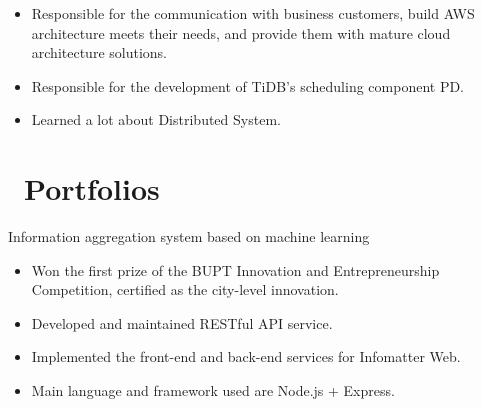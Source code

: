 \documentclass{resume}
\newcommand{\en}[1]{#1}
\newcommand{\zh}[1]{}
\begin{document}
\en{}
\zh{\datedsubsection{\textbf{\href{https://www.amazonaws.cn/}{亚马逊 AWS 中国（AWS China Inc.）}}}{2020/05 -- 2020/06}}
\en{}
\zh{\role{解决方案架构}{解决方案架构师实习}}
\begin{itemize}
      \item \en{Responsible for the communication with business customers, build AWS architecture meets their needs, and provide them with mature cloud architecture solutions.}
            \zh{负责 ToB 客户的技术接洽沟通，搭建符合其需求的 AWS 产品架构，为客户提供成熟的云架构解决方案}
\end{itemize}

\en{}
\zh{\datedsubsection{\textbf{\href{https://pingcap.com/zh/}{北京平凯星辰科技有限公司（PingCAP Inc.）}}}{2020/06 -- 至今}}
\en{}
\zh{\role{数据库研发}{调度研发实习}}
\begin{itemize}
      \item \en{Responsible for the development of TiDB's scheduling component PD.}
            \zh{负责 TiDB 调度组件 PD 的研发工作}
      \item \en{Learned a lot about Distributed System.}
            \zh{学到了很多关于分布式系统的相关知识}
\end{itemize}

\section{\faGithubAlt\ \en{Portfolios}\zh{个人项目}}
\en{Information aggregation system based on machine learning}
\zh{基于机器学习的信息聚合系统}
\begin{itemize}
      \item \en{Won the first prize of the BUPT Innovation and Entrepreneurship Competition, certified as the city-level innovation.}
            \zh{项目荣获北京邮电大学创新创业大赛一等奖，通过北京市级高等院校大创项目认定}
      \item \en{Developed and maintained RESTful API service.}
            \zh{开发维护相关 RESTful API 服务}
      \item \en{Implemented the front-end and back-end services for Infomatter Web.}
            \zh{实现了 Infomatter Web 版的前后端服务}
      \item \en{Main language and framework used are Node.js + Express.}
            \zh{语言和框架为 Node.js + Express}
\end{itemize}
\end{document}
